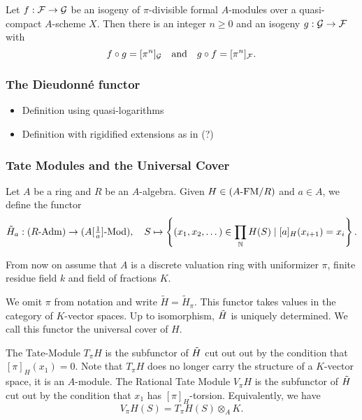 \begin{lem}
  Let $f: \mathcal{F} \to \mathcal{G}$ be an isogeny of $\pi$-divisible formal $A$-modules over a
  quasi-compact  $A$-scheme $X$. Then there is an 
  integer $n \geq 0$ and an isogeny $g: \mathcal{G} \to \mathcal{F}$ with 
  \begin{equation*}
    f \circ g = [\pi^n]_{\mathcal{G}} \quad \text{and} \quad g \circ f = [\pi^n]_{\mathcal{F}}.
  \end{equation*}
\end{lem}



\subsubsection{The Dieudonn\'e functor} %
\label{ssub:The Dieudonne functor}
\begin{itemize}
  \item Definition using quasi-logarithms
  \item Definition with rigidified extensions as in \cite{hopkins1994equivariant} (?)
\end{itemize}

\subsubsection{Tate Modules and the Universal Cover} %
\label{sub:Tate Modules and the Universal Cover}
Let $A$ be a ring and $R$ be an $A$-algebra. Given $H \in {({A}\text-\mathrm{FM}/{R})}$ and $a \in A$,
we define the functor 
\begin{equation*}
  \Tilde H_a : {({R}\text-\mathrm{Adm})} \to {({A[\tfrac 1a]}\text-\mathrm{Mod})}, \quad
  S \mapsto \left\{(x_1, x_2, \dots) \in \prod_{\mathbb{N}} H(S) \mid [a]_H(x_{i+1}) =
  x_i \right\}.
\end{equation*}

From now on assume that $A$ is a discrete valuation ring with uniformizer
$\pi$, finite residue field $k$ and field of fractions $K$. 

\begin{defi}
  We omit $\pi$ from notation and write $\tilde H = \tilde H_\pi$. This functor
  takes values in the category of $K$-vector spaces.
  Up to isomorphism, $\Tilde H$ is uniquely determined. We call this functor
  the universal cover of $H$. 

  The Tate-Module $T_\pi H$ is the subfunctor of $\Tilde H$ cut out out
  by the condition that $[\pi]_H(x_1) = 0$. Note that $T_\pi H$ does no longer 
  carry the structure of a $K$-vector space, it is an $A$-module. The Rational
  Tate Module $V_\pi H$ is the subfunctor of $\Tilde H$ cut out by the
  condition that $x_1$ has $[\pi]_H$-torsion. Equivalently, we have 
  \begin{equation*}
    V_\pi H (S) = T_\pi H(S) \otimes_A K.
  \end{equation*}
\end{defi}

